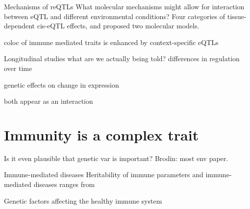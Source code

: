 \begin{outline}
\1 Mechanisms of reQTLs
What molecular mechanisms might allow for interaction between \Gls{eQTL} and different environmental conditions?
Four categories of tissue-dependent cis-eQTL effects, and proposed two molecular models.




coloc of immune mediated traits is enhanced by context-specific eQTLs



Longitudinal studies
    what are we actually being told?
    differences in regulation over time

    genetic effects on change in expression

    both appear as an interaction

\section{Immunity is a complex trait}

Is it even plausible that genetic var is important?
    Brodin: most env paper.

Immune-mediated diseases
    Heritability of immune parameters and immune-mediated diseases
        ranges from 


Genetic factors affecting the healthy immune system


\end{outline}
